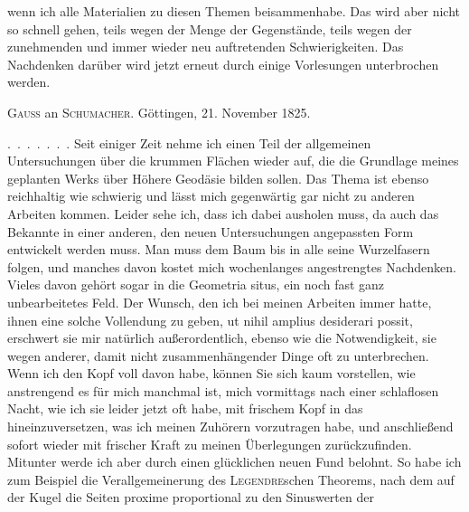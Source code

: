%
wenn ich alle Materialien zu diesen Themen beisammenhabe. Das wird aber nicht so schnell gehen, teils wegen der Menge der Gegenstände, teils wegen der zunehmenden und immer wieder neu auftretenden Schwierigkeiten. Das Nachdenken darüber wird jetzt erneut durch einige Vorlesungen unterbrochen werden.
\par{}
\begin{center}\textsc{Gauss} an \textsc{Schumacher}. Göttingen, 21. November 1825.\end{center}
\indent\mbox{. . . . . . .} Seit einiger Zeit nehme ich einen Teil der allgemeinen Untersuchungen über die krummen Flächen wieder auf, die die Grundlage meines geplanten Werks über Höhere Geodäsie bilden sollen. Das Thema ist ebenso reichhaltig wie schwierig und lässt mich gegenwärtig gar nicht zu anderen Arbeiten kommen. Leider sehe ich, dass ich dabei  ausholen muss, da auch das Bekannte in einer anderen, den neuen Untersuchungen angepassten Form entwickelt werden muss. Man muss dem Baum bis in alle seine Wurzelfasern folgen, und manches davon kostet mich wochenlanges angestrengtes Nachdenken. Vieles davon gehört sogar in die Geometria situs, ein noch fast ganz unbearbeitetes Feld. Der Wunsch, den ich bei meinen Arbeiten immer hatte, ihnen eine solche Vollendung zu geben, ut nihil amplius desiderari possit, erschwert sie mir natürlich außerordentlich, ebenso wie die Notwendigkeit, sie wegen anderer, damit nicht zusammenhängender Dinge oft zu unterbrechen. Wenn ich den Kopf voll davon habe, können Sie sich kaum vorstellen, wie anstrengend es für mich manchmal ist, mich vormittags nach einer schlaflosen Nacht, wie ich sie leider jetzt oft habe, mit frischem Kopf in das hineinzuversetzen, was ich meinen Zuhörern vorzutragen habe, und anschließend sofort wieder mit frischer Kraft zu meinen Überlegungen zurückzufinden. Mitunter werde ich aber durch einen glücklichen neuen Fund belohnt. So habe ich zum Beispiel die Verallgemeinerung des \textsc{Legendre}schen Theorems, nach dem auf der Kugel die Seiten proxime proportional zu den Sinuswerten der
